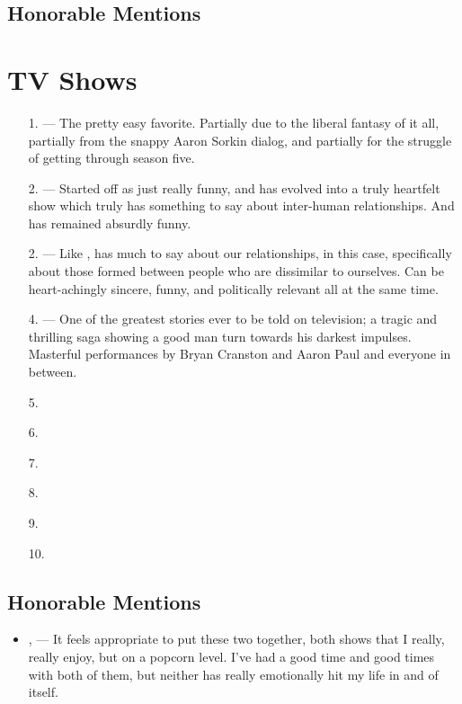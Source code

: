 \documentclass[../butidigress.tex]{subfiles}
\begin{document}
\subsection{Honorable Mentions}

\section{TV Shows}\label{sec:tvshowstopten}
\begin{itemize}
    \item[1.] \textbf{} --- The pretty easy favorite. Partially due to the liberal fantasy of it all, partially from the snappy Aaron Sorkin dialog, and partially for the struggle of getting through season five.
    \item[2.] \textbf{} --- Started off as just really funny, and has evolved into a truly heartfelt show which truly has something to say about inter-human relationships. And has remained absurdly funny.
    \item[2.] \textbf{} --- Like ,  has much to say about our relationships, in this case, specifically about those formed between people who are dissimilar to ourselves. Can be heart-achingly sincere, funny, and politically relevant all at the same time.
    \item[4.] \textbf{} --- One of the greatest stories ever to be told on television; a tragic and thrilling saga showing a good man turn towards his darkest impulses. Masterful performances by Bryan Cranston and Aaron Paul and everyone in between.
    \item[5.] \textbf{}
    \item[6.] \textbf{}
    \item[7.] \textbf{}
    \item[8.] \textbf{}
    \item[9.] \textbf{}
    \item[10.] \textbf{}
\end{itemize}
\subsection{Honorable Mentions}
\begin{itemize}
    \item \textbf{}, \textbf{} --- It feels appropriate to put these two together, both shows that I really, really enjoy, but on a popcorn level. I've had a good time and good times with both of them, but neither has really emotionally hit my life in and of itself.
\end{itemize}
\end{document}
